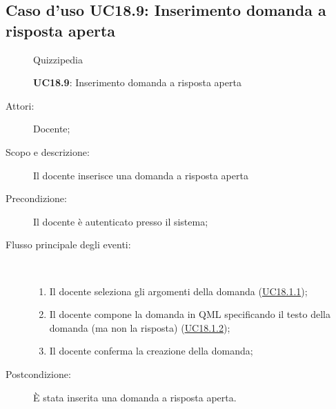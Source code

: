 \subsection{Caso d'uso UC18.9: Inserimento domanda a risposta aperta}
	\begin{figure}[H]
		\centering
		\begin{resizedtikzpicture}{\textwidth}
		\begin{umlsystem}[x=0, fill=lightgray!20]{Quizzipedia}
		\end{umlsystem}
		\end{resizedtikzpicture}
		\caption{\textbf{UC18.9}: Inserimento domanda a risposta aperta}
		\label{UC18.9}
	\end{figure}
\begin{description}
\item[Attori:] Docente;
\item[Scopo e descrizione:] Il docente inserisce una domanda a risposta aperta
      \item[Precondizione:] Il docente è autenticato presso il sistema;

        \item[Flusso principale degli eventi:] \ 
 \begin{enumerate}
          \item Il docente seleziona gli argomenti della domanda (\hyperlink{UC18.1.1}{UC18.1.1});
          \item Il docente compone la domanda in QML specificando il testo della domanda (ma non la risposta) (\hyperlink{UC18.1.2}{UC18.1.2});
          \item Il docente conferma la creazione della domanda;

      \end{enumerate}
    \item[Postcondizione:] È stata inserita una domanda a risposta aperta.
  \end{description}
\hypertarget{UC18.10}{}
